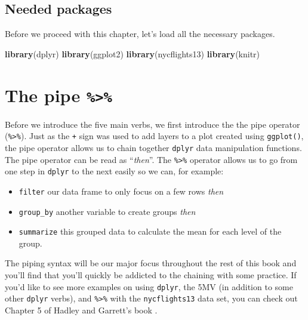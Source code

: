 \documentclass[]{tufte-book}
\newenvironment{Shaded}{\begin{snugshade}}{\end{snugshade}}
\newcommand{\KeywordTok}[1]{\textcolor[rgb]{0.13,0.29,0.53}{\textbf{{#1}}}}
\newcommand{\NormalTok}[1]{{#1}}
\providecommand{\tightlist}{%
  \setlength{\itemsep}{0pt}\setlength{\parskip}{0pt}}
\begin{document}
\subsection*{Needed packages}\label{needed-packages-2}

Before we proceed with this chapter, let's load all the necessary
packages.

\begin{Shaded}
\begin{Highlighting}[]
\KeywordTok{library}\NormalTok{(dplyr)}
\KeywordTok{library}\NormalTok{(ggplot2)}
\KeywordTok{library}\NormalTok{(nycflights13)}
\KeywordTok{library}\NormalTok{(knitr)}
\end{Highlighting}
\end{Shaded}

\section{\texorpdfstring{The pipe
\texttt{\%\textgreater{}\%}}{The pipe \%\textgreater{}\%}}\label{the-pipe}

Before we introduce the five main verbs, we first introduce the the pipe
operator (\texttt{\%\textgreater{}\%}). Just as the \texttt{+} sign was
used to add layers to a plot created using \texttt{ggplot()}, the pipe
operator allows us to chain together \texttt{dplyr} data manipulation
functions. The pipe operator can be read as ``\emph{then}''. The
\texttt{\%\textgreater{}\%} operator allows us to go from one step in
\texttt{dplyr} to the next easily so we can, for example:

\begin{itemize}
\tightlist
\item
  \texttt{filter} our data frame to only focus on a few rows \emph{then}
\item
  \texttt{group\_by} another variable to create groups \emph{then}
\item
  \texttt{summarize} this grouped data to calculate the mean for each
  level of the group.
\end{itemize}

The piping syntax will be our major focus throughout the rest of this
book and you'll find that you'll quickly be addicted to the chaining
with some practice. If you'd like to see more examples on using
\texttt{dplyr}, the 5MV (in addition to some other \texttt{dplyr}
verbs), and \texttt{\%\textgreater{}\%} with the \texttt{nycflights13}
data set, you can check out Chapter 5 of Hadley and Garrett's book
\citep{rds2016}.
\end{document}
